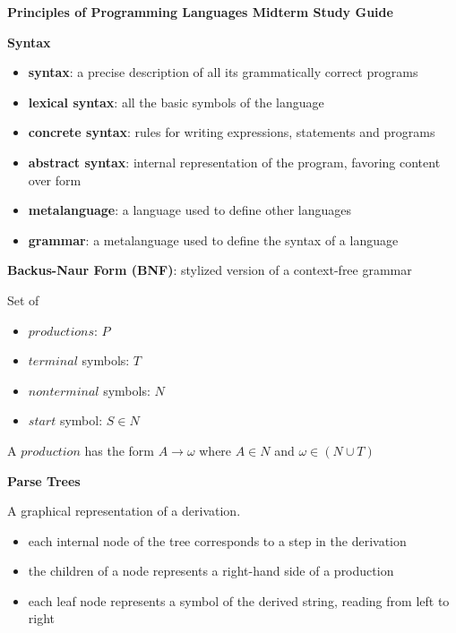 \documentclass[11pt]{article} %
\begin{document}
 

\begin{center}
{\bf Principles of Programming Languages Midterm Study Guide}
\end{center}

{\bf Syntax}
\medskip

\begin{itemize}

\item {\bf syntax}: a precise description of all its grammatically correct programs

\item {\bf lexical syntax}: all the basic symbols of the language

\item {\bf concrete syntax}: rules for writing expressions, statements and programs

\item {\bf abstract syntax}: internal representation of the program, favoring content over form

\item {\bf metalanguage}: a language used to define other languages

\item {\bf grammar}: a metalanguage used to define the syntax of a language

\end{itemize}

{\bf Backus-Naur Form (BNF)}: stylized version of a context-free grammar

\medskip
Set of

\begin{itemize}
\item $productions$: $P$
\item $terminal$ symbols: $T$
\item $nonterminal$ symbols: $N$
\item $start$ symbol: $S \in N$
\end{itemize}

A $production$ has the form $A \rightarrow \omega$ where $A \in N$ and $\omega \in (N \cup T)$

\medskip
{\bf Parse Trees}

A graphical representation of a derivation.

\begin{itemize}
\item each internal node of the tree corresponds to a step in the derivation
\item the children of a node represents a right-hand side of a production
\item each leaf node represents a symbol of the derived string, reading from left to right
\end{itemize}
\end{document}
